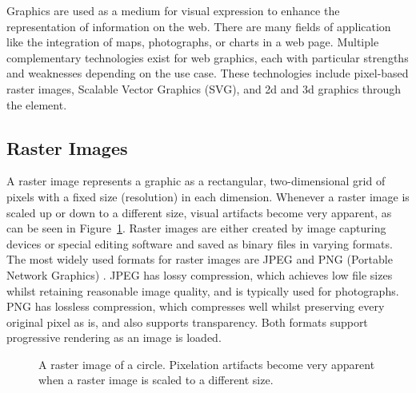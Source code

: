 Graphics are used as a medium for visual expression to enhance the
representation of information on the web. There are many fields of
application like the integration of maps, photographs, or charts in a
web page. Multiple complementary technologies exist for web graphics,
each with particular strengths and weaknesses depending on the use
case. These technologies include pixel-based raster images, Scalable
Vector Graphics (SVG), and 2d and 3d graphics through the
 element.



\subsection{Raster Images}
\label{sec:RasterImages}

A raster image represents a graphic as a rectangular, two-dimensional
grid of pixels with a fixed size (resolution) in each dimension.
Whenever a raster image is scaled up or down to a different size,
visual artifacts become very apparent, as can be seen in
Figure~\ref{fig:RasterImage}. Raster images are either created by
image capturing devices or special editing software and saved as
binary files in varying formats. The most widely used formats for
raster images are JPEG \parencite{JPEG} and PNG (Portable Network
Graphics) \parencite{PNG}. JPEG has lossy compression, which achieves
low file sizes whilst retaining reasonable image quality, and is
typically used for photographs. PNG has lossless compression, which
compresses well whilst preserving every original pixel as is, and also
supports transparency. Both formats support progressive rendering as
an image is loaded.


\begin{figure}[tp]
\centering
{}
\hspace{1cm}
\caption[Raster Image Scaling]{%
A raster image of a circle.
Pixelation artifacts become very apparent when a raster image
is scaled to a different size.
}
\label{fig:RasterImage}
\end{figure}



